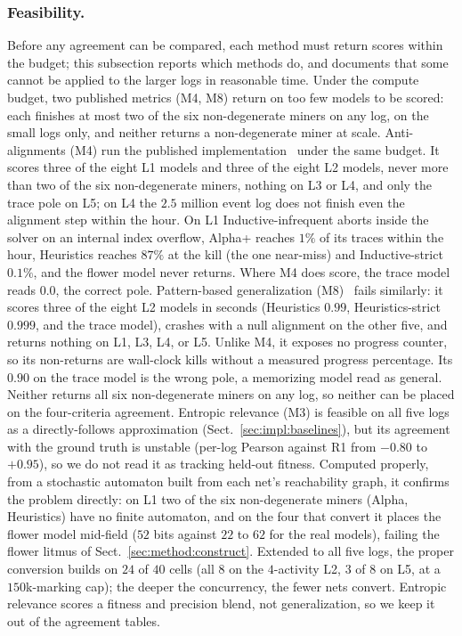 \documentclass[runningheads]{llncs}
\newcommand{\chg}[1]{#1}
\begin{document}
\subsubsection{Feasibility.}
\label{sec:eval:feasibility}
Before any agreement can be compared, each method must return scores within the budget; this subsection reports which methods do, and documents that some cannot be applied to the larger logs in reasonable time. \chg{Under the compute budget, two published metrics (M4, M8) return on too few models to be scored: each finishes at most two of the six non-degenerate miners on any log, on the small logs only, and neither returns a non-degenerate miner at scale. Anti-alignments (M4) run the published implementation~\cite{vandongen2016anti} under the same budget. It scores three of the eight L1 models and three of the eight L2 models, never more than two of the six non-degenerate miners, nothing on L3 or L4, and only the trace pole on L5; on L4 the $2.5$ million event log does not finish even the alignment step within the hour. On L1 Inductive-infrequent aborts inside the solver on an internal index overflow, Alpha+ reaches $1\%$ of its traces within the hour, \chg{Heuristics reaches $87\%$ at the kill (the one near-miss) and Inductive-strict $0.1\%$,} and the flower model never returns. Where M4 does score, the trace model reads $0.0$, the correct pole. Pattern-based generalization (M8)~\cite{reissner2022pattern} fails similarly: it scores three of the eight L2 models in seconds (Heuristics $0.99$, Heuristics-strict $0.999$, and the trace model), crashes with a null alignment on the other five, and returns nothing on L1, L3, L4, or L5. \chg{Unlike M4, it exposes no progress counter, so its non-returns are wall-clock kills without a measured progress percentage.} Its $0.90$ on the trace model is the wrong pole, a memorizing model read as general. Neither returns all six non-degenerate miners on any log, so neither can be placed on the four-criteria agreement.} \chg{Entropic relevance (M3) is feasible on all five logs as a directly-follows approximation (Sect.~\ref{sec:impl:baselines}), but its agreement with the ground truth is unstable (per-log Pearson against R1 from $-0.80$ to $+0.95$), so we do not read it as tracking held-out fitness. Computed properly, from a stochastic automaton built from each net's reachability graph, it confirms the problem directly: on L1 two of the six non-degenerate miners (Alpha, Heuristics) have no finite automaton, and on the four that convert it places the flower model mid-field ($52$ bits against $22$ to $62$ for the real models), failing the flower litmus of Sect.~\ref{sec:method:construct}. Extended to all five logs, the proper conversion builds on $24$ of $40$ cells (all $8$ on the $4$-activity L2, $3$ of $8$ on L5, at a $150$k-marking cap); the deeper the concurrency, the fewer nets convert. Entropic relevance scores a fitness and precision blend, not generalization, so we keep it out of the agreement tables.}
\end{document}
